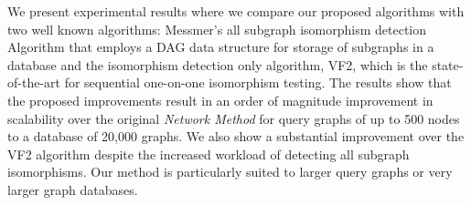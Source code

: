 
We present experimental results where we compare our proposed algorithms with two well known algorithms: Messmer's all subgraph isomorphism detection Algorithm that employs a DAG data structure for storage of subgraphs in a database and the isomorphism detection only algorithm, VF2, which is the state-of-the-art for sequential one-on-one isomorphism testing. The results show that the proposed improvements result in an order of magnitude improvement in scalability over the original \textit{Network Method}  for query graphs of up to 500 nodes to a database of 20,000 graphs. We also show a substantial improvement over the VF2 algorithm despite the increased workload of detecting all subgraph isomorphisms. Our method is particularly suited to larger query graphs or very larger graph databases.

